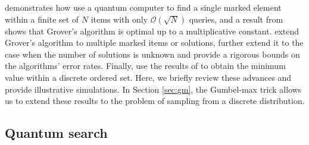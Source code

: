 \documentclass[12pt]{article} %
\DeclarePairedDelimiter{\ceil}{\lceil}{\rceil}
\begin{document}
\citet{grover1996fast} demonstrates how use a quantum computer to find a single marked element within a finite set of $N$ items with only $\mathcal{O}(\sqrt{N})$ queries, and a result from \citet{bennett1997strengths} shows that Grover's algorithm is optimal up to a multiplicative constant. \citet{boyer1998tight} extend Grover's algorithm to multiple marked items or solutions, further extend it to the case when the number of solutions is unknown and provide a rigorous bounds on the algorithms' error rates.  Finally, \citet{durr1996quantum} use the results of \citet{boyer1998tight} to obtain the minimum value within a discrete ordered set.  Here, we briefly review these advances and provide illustrative simulations.  In Section \ref{sec:gm}, the Gumbel-max trick allows us to extend these results to the problem of sampling from a discrete distribution.

\subsection{Quantum search}\label{sec:qSearch}

\begin{figure}[!t]
	\centering
\end{figure}
\end{document}
